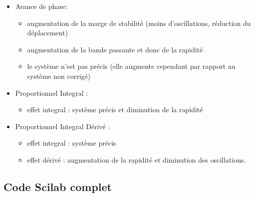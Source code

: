\begin{itemize}
    \item Avance de phase: 
        \begin{itemize}
            \item augmentation de la marge de stabilité 
                  (moins d'oscillations, réduction du déplacement)
            \item augmentation de la bande passante et donc de la rapidité
            \item le système n'est pas précis (elle augmente cependant par 
                  rapport au système non corrigé)
        \end{itemize}
    \item Proportionnel Integral : 
        \begin{itemize}
            \item effet integral : système précis et diminution de la rapidité 
        \end{itemize} 
    \item Proportionnel Integral Dérivé :
        \begin{itemize}
            \item effet integral : système précis
            \item effet dérivé : augmentation de la rapidité et 
                  diminution des oscillations.
        \end{itemize} 
\end{itemize}
\clearpage
\subsection*{Code Scilab complet}
\inputminted{scilab}{codes/scilab/code_exercice_chap_correction.sce}
